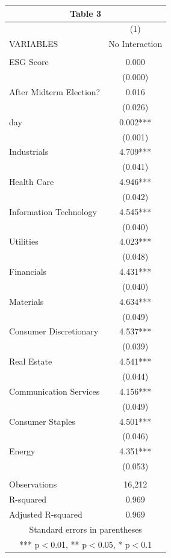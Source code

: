 \begin{tabular}{lc}
\multicolumn{2}{c}{Table 3} \\ \hline
 & (1) \\
VARIABLES & No Interaction \\ \hline
 &  \\
ESG Score & 0.000 \\
 & (0.000) \\
After Midterm Election? & 0.016 \\
 & (0.026) \\
day & 0.002*** \\
 & (0.001) \\
Industrials & 4.709*** \\
 & (0.041) \\
Health Care & 4.946*** \\
 & (0.042) \\
Information Technology & 4.545*** \\
 & (0.040) \\
Utilities & 4.023*** \\
 & (0.048) \\
Financials & 4.431*** \\
 & (0.040) \\
Materials & 4.634*** \\
 & (0.049) \\
Consumer Discretionary & 4.537*** \\
 & (0.039) \\
Real Estate & 4.541*** \\
 & (0.044) \\
Communication Services & 4.156*** \\
 & (0.049) \\
Consumer Staples & 4.501*** \\
 & (0.046) \\
Energy & 4.351*** \\
 & (0.053) \\
 &  \\
Observations & 16,212 \\
R-squared & 0.969 \\
 Adjusted R-squared & 0.969 \\ \hline
\multicolumn{2}{c}{ Standard errors in parentheses} \\
\multicolumn{2}{c}{ *** p$<$0.01, ** p$<$0.05, * p$<$0.1} \\
\end{tabular}
